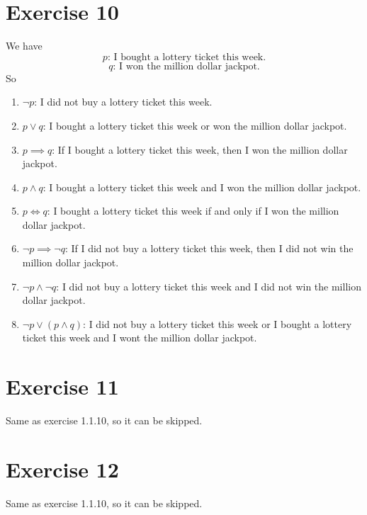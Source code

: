 \documentclass{article}
\begin{document}
    \section*{Exercise 10}
    We have 
    \[ p \text{: I bought a lottery ticket this week.} \]
    \[ q \text{: I won the million dollar jackpot.} \]
    So
    \begin{enumerate}[label=\textbf{\alph*.}]
        \item
            $\neg p$: I did not buy a lottery ticket this week.
        \item
            $p \lor q$: I bought a lottery ticket this week
            or won the million dollar jackpot.
        \item 
            $p \implies q$: If I bought a lottery ticket this week,
            then I won the million dollar jackpot.
        \item 
            $p \land q$: I bought a lottery ticket this week
            and I won the million dollar jackpot.
        \item
            $p \iff q$: I bought a lottery ticket this week if and only if
            I won the million dollar jackpot.
        \item
            $\neg p \implies \neg q$:
            If I did not buy a lottery ticket this week,
            then I did not win the million dollar jackpot.
        \item
            $\neg p \land \neg q$:
            I did not buy a lottery ticket this week
            and I did not win the million dollar jackpot.
        \item 
            $\neg p \lor (p \land q)$:
            I did not buy a lottery ticket this week
            or I bought a lottery ticket this week
            and I wont the million dollar jackpot.
    \end{enumerate}


    \section*{Exercise 11}
    Same as exercise 1.1.10, so it can be skipped.

    
    \section*{Exercise 12}
    Same as exercise 1.1.10, so it can be skipped.
\end{document}
